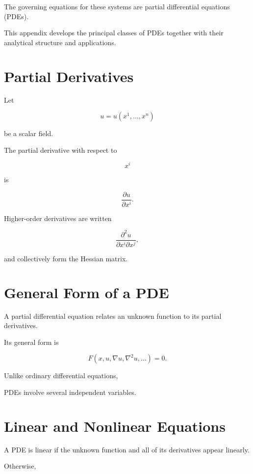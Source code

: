 \documentclass[11pt,fleqn]{book}
\numberwithin{equation}{chapter}
\theoremstyle{plain}
\theoremstyle{definition}
\theoremstyle{remark}
\begin{document}
The governing equations for these systems are partial differential
equations (PDEs).

This appendix develops the principal classes of PDEs together with their
analytical structure and applications.


\section{Partial Derivatives}

Let

\[
u=u(x^1,\ldots,x^n)
\]

be a scalar field.

The partial derivative with respect to

\[
x^i
\]

is

\[
\boxed{
\frac{\partial u}{\partial x^i}.
}
\]

Higher-order derivatives are written

\[
\frac{\partial^2u}
{\partial x^i\partial x^j},
\]

and collectively form the Hessian matrix.


\section{General Form of a PDE}

A partial differential equation relates an unknown function to its
partial derivatives.

Its general form is

\[
\boxed{
F
\left(
x,
u,
\nabla u,
\nabla^2u,
\ldots
\right)
=
0.
}
\]

Unlike ordinary differential equations,

PDEs involve several independent variables.


\section{Linear and Nonlinear Equations}

A PDE is linear if the unknown function and all of its derivatives
appear linearly.

Otherwise,
\end{document}
